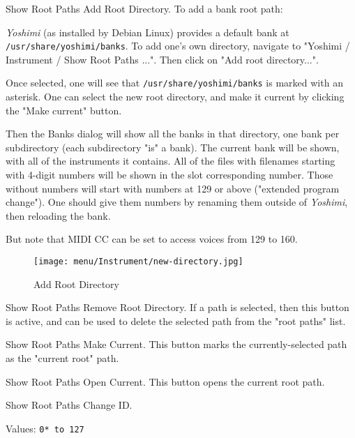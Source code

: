    \setcounter{ItemCounter}{0}      %

   Show Root Paths Add Root Directory.
   To add a bank root path:

   \textsl{Yoshimi} (as installed by Debian Linux) provides a default bank at
   \texttt{/usr/share/yoshimi/banks}.
   To add one's own directory, navigate to "Yoshimi / Instrument / Show Root
   Paths ...".  Then click on "Add root directory...".

   Once selected, one will see that \texttt{/usr/share/yoshimi/banks}
   is marked with an asterisk.  One can select the new root directory,
   and make it current by clicking the "Make current" button.

   Then the Banks dialog will show all the banks in that directory, one bank
   per subdirectory (each subdirectory "is" a bank).  The current bank will
   be shown, with all of the instruments it contains.  All of the files with
   filenames starting with 4-digit numbers will be shown in the slot
   corresponding number.  Those without numbers will start with numbers at
   129 or above ("extended program change").  One should
   give them numbers by renaming them outside of \textsl{Yoshimi},
   then reloading the bank.

   But note that MIDI CC can be set to access voices from 129 to 160.

\begin{figure}[H]
   \centering 
   \texttt{[image: menu/Instrument/new-directory.jpg]}
   \caption{Add Root Directory}
   \label{fig:add_root_directory}
\end{figure}

   Show Root Paths Remove Root Directory.
   If a path is selected, then this button is active, and can be used to
   delete the selected path from the "root paths" list.

   Show Root Paths Make Current.
   This button marks the currently-selected path as the "current root" path.

   Show Root Paths Open Current.
   This button opens the current root path.

   Show Root Paths Change ID.

   Values: \texttt{0* to 127}

